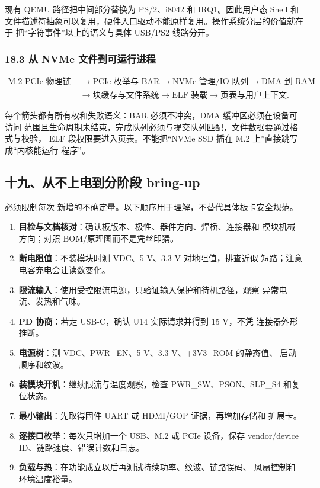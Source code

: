 现有 QEMU 路径把中间部分替换为 PS/2、i8042 和 IRQ1。因此用户态 Shell 和
文件描述符抽象可以复用，硬件入口驱动不能原样复用。操作系统分层的价值就在于
把“字符事件”以上的语义与具体 USB/PS2 线路分开。

\subsubsection{18.3 从 NVMe 文件到可运行进程}

\[
\begin{aligned}
\text{M.2 PCIe 物理链路}
&\rightarrow \text{PCIe 枚举与 BAR}
\rightarrow \text{NVMe 管理/IO 队列}
\rightarrow \text{DMA 到 RAM}\\
&\rightarrow \text{块缓存与文件系统}
\rightarrow \text{ELF 装载}
\rightarrow \text{页表与用户上下文}.
\end{aligned}
\]

每个箭头都有所有权和失败语义：BAR 必须不冲突，DMA 缓冲区必须在设备可访问
范围且生命周期未结束，完成队列必须与提交队列匹配，文件数据要通过格式与校验，
ELF 段权限要进入页表。不能把“NVMe SSD 插在 M.2 上”直接跳写成“内核能运行
程序”。

\subsection{十九、从不上电到分阶段 bring-up}

必须限制每次
新增的不确定量。以下顺序用于理解，不替代具体板卡安全规范。

\begin{enumerate}[leftmargin=2em]
  \item \textbf{目检与文档核对}：确认板版本、极性、器件方向、焊桥、连接器和
        模块机械方向；对照 BOM/原理图而不是凭丝印猜。
  \item \textbf{断电阻值}：不装模块时测 VDC、5 V、3.3 V 对地阻值，排查近似
        短路；注意电容充电会让读数变化。
  \item \textbf{限流输入}：使用受控限流电源，只验证输入保护和待机路径，观察
        异常电流、发热和气味。
  \item \textbf{PD 协商}：若走 USB-C，确认 U14 实际请求并得到 15 V，不凭
        连接器外形推断。
  \item \textbf{电源树}：测 VDC、PWR\_EN、5 V、3.3 V、+3V3\_ROM 的静态值、
        启动顺序和纹波。
  \item \textbf{装模块开机}：继续限流与温度观察，检查 PWR\_SW、PSON、SLP\_S4
        和复位状态。
  \item \textbf{最小输出}：先取得固件 UART 或 HDMI/GOP 证据，再增加存储和
        扩展卡。
  \item \textbf{逐接口枚举}：每次只增加一个 USB、M.2 或 PCIe 设备，保存
        vendor/device ID、链路速度、错误计数和日志。
  \item \textbf{负载与热}：在功能成立以后再测试持续功率、纹波、链路误码、
        风扇控制和环境温度裕量。
\end{enumerate}


